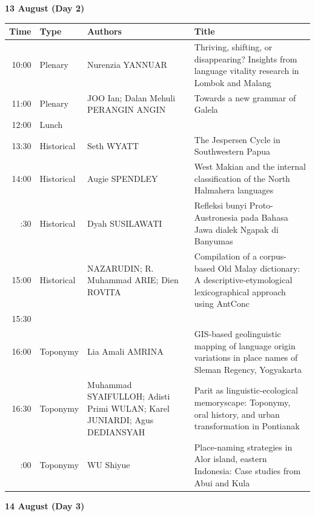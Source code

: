 \documentclass[
  11pt,
]{article}
\begin{document}
\pagebreak

\begin{center}
\bf 13 August (Day 2)
\end{center}

\begin{longtable}{rp{4.3cm}p{4.3cm}p{4.3cm}}
\toprule
Time & Type & Authors & Title\\
\midrule
10:00 & Plenary & Nurenzia YANNUAR & Thriving, shifting, or disappearing? Insights from language vitality research in Lombok and Malang\\
11:00 & Plenary & JOO Ian; Dalan Mehuli PERANGIN ANGIN & Towards a new grammar of Galela\\
12:00 & Lunch &  & \\
13:30 & Historical & Seth WYATT & The Jespersen Cycle in Southwestern Papua\\
14:00 & Historical & Augie SPENDLEY & West Makian and the internal classification of the North Halmahera languages\\
\addlinespace
14:30 & Historical & Dyah SUSILAWATI & Refleksi bunyi Proto-Austronesia pada Bahasa Jawa dialek Ngapak di Banyumas\\
15:00 & Historical & NAZARUDIN; R. Muhammad ARIE; Dien ROVITA & Compilation of a corpus-based Old Malay dictionary: A descriptive-etymological lexicographical approach using AntConc\\
15:30 &  &  & \\
16:00 & Toponymy & Lia Amali AMRINA & GIS-based geolinguistic mapping of language origin variations in place names of Sleman Regency, Yogyakarta\\
16:30 & Toponymy & Muhammad SYAIFULLOH; Adisti Primi WULAN; Karel JUNIARDI; Agus DEDIANSYAH & Parit as linguistic-ecological memoryscape: Toponymy, oral history, and urban transformation in Pontianak\\
\addlinespace
17:00 & Toponymy & WU Shiyue & Place-naming strategies in Alor island, eastern Indonesia: Case studies from Abui and Kula\\
\bottomrule
\end{longtable}

\pagebreak

\begin{center}
\bf 14 August (Day 3)
\end{center}
\end{document}
